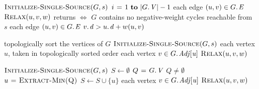 \documentclass[twocolumn]{article}
\begin{document}
\begin{codebox}
\li $\textnormal{\scshape Initialize-Single-Source}(G,s)$
\li \For $i \gets 1 \To \vert \attrib{G}{V}\vert -1$
\li \Do \For each edge $(u,v) \in \attrib{G}{E}$
\li 		\Do $\textnormal{\scshape Relax}(u,v,w)$
		\End
	\End
\li \Comment returns  $\iff$ $G$ contains no negative-weight 
\zi cycles reachable from $s$
\li \For each edge $(u,v) \in \attrib{G}{E}$
\li \Do \If $\attrib{v}{d} > \attrib{u}{d} + w(u,v)$
\li 		\Then \Return {}
		\End
	\End
\li \Return {}
\end{codebox}

\begin{codebox}
\li topologically sort the vertices of $G$
\li $\textnormal{\scshape Initialize-Single-Source}(G,s)$
\li \For each vertex $u$, taken in topologically sorted order
\li \Do \For each vertex $v \in \attrib{G}{Adj[u]}$
\li 		\Do $\textnormal{\scshape Relax}(u,v,w)$
		\End
	\End
\end{codebox}

\begin{codebox}
\li $\textnormal{\scshape Initialize-Single-Source}(G,s)$
\li $S \gets \emptyset$
\li $Q \gets \attrib{G}{V}$
\li \While $Q \neq \emptyset$
\li \Do $u \mathrel{\hspace{1pt}=\hspace{1pt}} \textnormal{\scshape Extract-Min(Q)}$
\li 		$S \gets S \cup \{ u\}$
\li 		\For each vertex $v \in \attrib{G}{Adj[u]}$
\li 		\Do $\textnormal{\scshape Relax}(u,v,w)$
		\End
	\End
\end{codebox}
\end{document}
